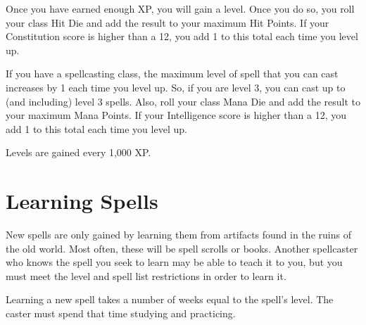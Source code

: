 \begin{multicols}{2}
Once you have earned enough XP, you will gain a level. Once you do so, you roll
your class Hit Die and add the result to your maximum Hit Points. If your
Constitution score is higher than a 12, you add 1 to this total each time you
level up.

If you have a spellcasting class, the maximum level of spell that you can cast
increases by 1 each time you level up. So, if you are level 3, you can cast up
to (and including) level 3 spells. Also, roll your class Mana Die and add the
result to your maximum Mana Points. If your Intelligence score is higher than a
12, you add 1 to this total each time you level up.

Levels are gained every 1,000 XP.

\section{Learning Spells}

New spells are only gained by learning them from artifacts found in the ruins
of the old world. Most often, these will be spell scrolls or books. Another
spellcaster who knows the spell you seek to learn may be able to teach it to
you, but you must meet the level and spell list restrictions in order to
learn it.

Learning a new spell takes a number of weeks equal to the spell's level. The
caster must spend that time studying and practicing.

\end{multicols}
